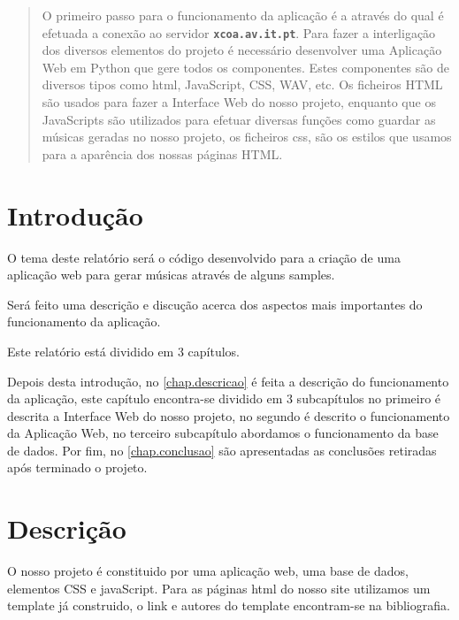 \documentclass[a4paper]{report}
\begin{document}
\begin{abstract}
O primeiro passo para o funcionamento da aplicação é a  através do qual é efetuada a conexão ao servidor \textbf{\texttt{xcoa.av.it.pt}}. Para fazer a interligação dos diversos elementos do projeto é necessário desenvolver uma Aplicação Web  em Python que gere todos os componentes. Estes componentes são de diversos tipos como \ac{html}, JavaScript, CSS, WAV, etc. Os ficheiros HTML são usados para fazer a Interface Web do nosso projeto, enquanto que os JavaScripts são utilizados para efetuar diversas funções como guardar as músicas geradas no nosso projeto, os ficheiros css, são os estilos que usamos para a aparência dos nossas páginas HTML. 

\end{abstract}


\tableofcontents


\clearpage
{}

\chapter{Introdução}
\label{chap.introducao}

O tema deste relatório será o código desenvolvido para a criação de uma aplicação web para gerar músicas através de alguns samples.

Será feito uma descrição e discução acerca dos aspectos mais importantes do funcionamento da aplicação.

Este relatório está dividido em 3 capítulos.

Depois desta introdução, no \autoref{chap.descricao} é feita a descrição do funcionamento da aplicação, este capítulo encontra-se dividido em 3 subcapítulos no primeiro é descrita a Interface Web do nosso projeto, no segundo é descrito o funcionamento da Aplicação Web, no terceiro subcapítulo abordamos o funcionamento da base de dados. Por fim, no \autoref{chap.conclusao} são apresentadas as conclusões retiradas após terminado o projeto.

\chapter{Descrição}
\label{chap.descricao}

O nosso projeto é constituido por uma aplicação web, uma base de dados, elementos CSS e javaScript. Para as páginas html do nosso site utilizamos um template já construido, o link e autores do template encontram-se na bibliografia.
\end{document}
